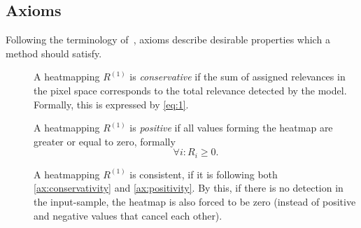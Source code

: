 \subsection{Axioms}
Following the terminology of~\cite{Sundararajan.2017}, axioms describe desirable properties which a method should satisfy.

\begin{description}
    \item[] A heatmapping \(R^{(1)}\) is \textit{conservative} if the sum of assigned relevances in the pixel space corresponds to the total relevance detected by the model.\cite{Montavon.2017} %
    Formally, this is expressed by \cref{eq:1}.
    \item[] A heatmapping \(R^{(1)}\) is \textit{positive} if all values forming the heatmap are greater or equal to zero\cite{Montavon.2017},%
    formally
    \[
        \forall i: R_i \geq 0.
    \]
    \item[] A heatmapping \(R^{(1)}\) is consistent, if it is following both \ref{ax:conservativity} and \ref{ax:positivity}.\cite{Montavon.2017} By this, if there is no detection in the input-sample, the heatmap is also forced to be zero (instead of positive and negative values that cancel each other)\cite{Montavon.2017}.
\end{description}
%
%
